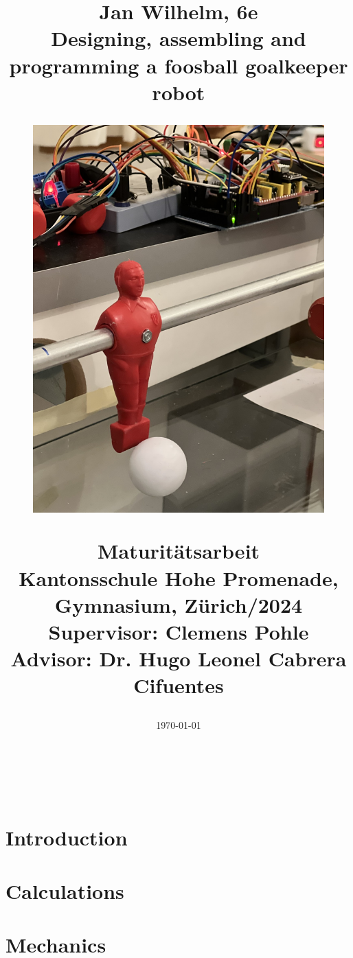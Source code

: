 \documentclass[11pt,openany]{book}
\title{
    \linespread{1.8}
    Jan Wilhelm, 6e\\
    \linespread{1}
    \Huge \textbf{Designing, assembling and programming a foosball goalkeeper robot}\\
    \linespread{1.8}
    \begin{figure}[H]
        \centering
        \includegraphics[width=0.55\linewidth]{../photos/title}
        \caption*{}
        \label{fig:title}
    \end{figure}
\Large
    \textbf{Maturitätsarbeit}\\
    Kantonsschule Hohe Promenade, Gymnasium, Zürich/2024\\
    \textbf{Supervisor:} Clemens Pohle\\
    \textbf{Advisor:} Dr. Hugo Leonel Cabrera Cifuentes\\
    \linespread{1}}
\date\today
\newcommand{\bottompage}{-- \thepage\ --}
\renewcommand{\headrulewidth}{0.2pt}
\renewcommand{\footrulewidth}{0.2pt}}
\begin{document}
    \makeatletter
    \voffset=-1cm
    \begin{titlepage}
        \thispagestyle{fancy}
        \renewcommand{\headrulewidth}{0pt}
        \renewcommand{\footrulewidth}{0pt}
        \rhead{}
        \cfoot{} %
        \hbox{}\vfill
        \begin{center}
        {\LARGE\@title}
            \\[3em]
            {\large\@author}\\[1.75em]
            {\large\@date}
        \end{center}
        \vspace{3cm}\vfill
    \end{titlepage}
    \makeatother
    \voffset=-2.0cm
    \textheight=26.4cm


    \shipout\null


    \renewcommand{\bottompage}{}
    \tableofcontents


    \chapter{Introduction}\label{ch:introduction}
    \renewcommand{\bottompage}{-- \thepage\ --}
    \setcounter{page}{1}
    


    \chapter{Calculations}\label{ch:calculations}
    


    \chapter{Mechanics}\label{ch:mechanics}
    
\end{document}
